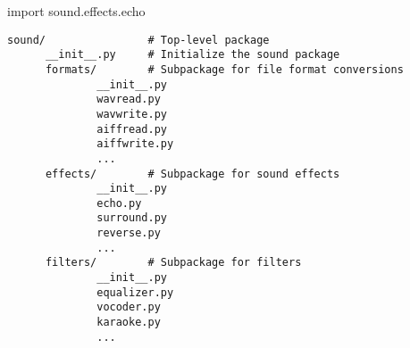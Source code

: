 \documentclass[hyperref={pdftex,unicode}]{beamer}
\begin{document}
\begin{frame}[fragile]{import sound.effects.echo}
  \begin{lstlisting}[basicstyle=\scriptsize\ttfamily]
sound/                # Top-level package
      __init__.py     # Initialize the sound package
      formats/        # Subpackage for file format conversions
              __init__.py
              wavread.py
              wavwrite.py
              aiffread.py
              aiffwrite.py
              ...
      effects/        # Subpackage for sound effects
              __init__.py
              echo.py
              surround.py
              reverse.py
              ...
      filters/        # Subpackage for filters
              __init__.py
              equalizer.py
              vocoder.py
              karaoke.py
              ...
  \end{lstlisting}
\end{frame}
\end{document}
